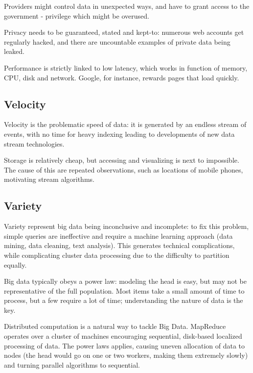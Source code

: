 Providers might control data in unexpected ways, and have to grant access to the government - privilege which might be overused.

Privacy needs to be guaranteed, stated and kept-to: numerous web accounts get regularly hacked, and there are uncountable examples of private data being leaked. 

Performance is strictly linked to low latency, which works in function of memory, CPU, disk and network. Google, for instance, rewards pages that load quickly. 

\subsection{Velocity}
Velocity is the problematic speed of data: it is generated by an endless stream of events, with no time for heavy indexing leading to developments of new data stream technologies. 

Storage is relatively cheap, but accessing and visualizing is next to impossible. The cause of this are repeated observations, such as locations of mobile phones, motivating stream algorithms. 

\subsection{Variety}
Variety represent big data being inconclusive and incomplete: to fix this problem, simple queries are ineffective and require a machine learning approach (data mining, data cleaning, text analysis). This generates technical complications, while complicating cluster data processing due to the difficulty to partition equally.

Big data typically obeys a power law: modeling the head is easy, but may not be representative of the full population. Most items take a small amount of time to process, but a few require a lot of time; understanding the nature of data is the key. 

Distributed computation is a natural way to tackle Big Data. MapReduce operates over a cluster of machines encouraging sequential, disk-based localized processing of data. The power laws applies, causing uneven allocation of data to nodes (the head would go on one or two workers, making them extremely slowly) and turning parallel algorithms to sequential. 


